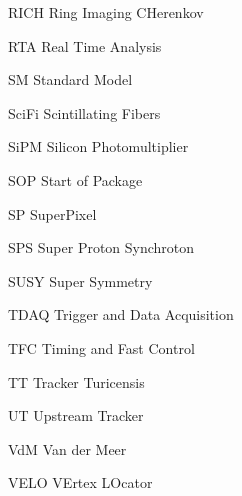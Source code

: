 \begin{abbreviations}
    \item[RICH] Ring Imaging CHerenkov
    \item[RTA] Real Time Analysis
    \item[SM] Standard Model
    \item[SciFi] Scintillating Fibers
    \item[SiPM] Silicon Photomultiplier
    \item[SOP] Start of Package
    \item[SP] SuperPixel
    \item[SPS] Super Proton Synchroton
    \item[SUSY] Super Symmetry
    \item[TDAQ] Trigger and Data Acquisition
    \item[TFC] Timing and Fast Control
    \item[TT] Tracker Turicensis
    \item[UT] Upstream Tracker
    \item[VdM] Van der Meer
    \item[VELO] VErtex LOcator
\end{abbreviations}

